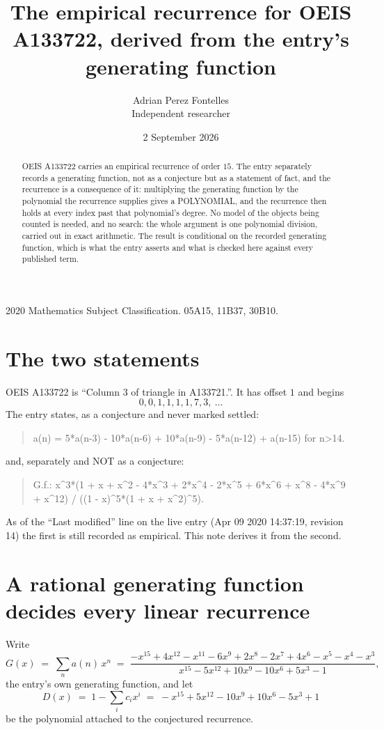 \documentclass[11pt,a4paper]{article}
\title{The empirical recurrence for OEIS A133722, derived from the entry's generating function}
\author{Adrian Perez Fontelles\\ \small Independent researcher}
\date{2 September 2026}
\theoremstyle{plain}
\theoremstyle{definition}
\begin{document}
\maketitle

\begin{abstract}
OEIS A133722 carries an empirical recurrence of order $15$. The entry separately records a
generating function, not as a conjecture but as a statement of fact, and the recurrence is a
consequence of it: multiplying the generating function by the polynomial the recurrence
supplies gives a POLYNOMIAL, and the recurrence then holds at every index past that
polynomial's degree. No model of the objects being counted is needed, and no search: the
whole argument is one polynomial division, carried out in exact arithmetic. The result is
conditional on the recorded generating function, which is what the entry asserts and what is
checked here against every published term.
\end{abstract}

\noindent\small 2020 Mathematics Subject Classification. 05A15, 11B37, 30B10.\normalsize

\section{The two statements}

OEIS A133722 is ``Column 3 of triangle in A133721.''. It has offset $1$ and begins
\[
0, 0, 1, 1, 1, 1, 7, 3,\ \dots
\]
The entry states, as a conjecture and never marked settled:
\begin{quote}
a(n) = 5*a(n-3) - 10*a(n-6) + 10*a(n-9) - 5*a(n-12) + a(n-15) for n>14.
\end{quote}
and, separately and NOT as a conjecture:
\begin{quote}
G.f.: x\^{}3*(1 + x + x\^{}2 - 4*x\^{}3 + 2*x\^{}4 - 2*x\^{}5 + 6*x\^{}6 + x\^{}8 - 4*x\^{}9 + x\^{}12) / ((1 - x)\^{}5*(1 + x + x\^{}2)\^{}5).
\end{quote}
As of the ``Last modified'' line on the live entry (Apr 09 2020 14:37:19, revision 14) the first is still
recorded as empirical. This note derives it from the second.

\section{A rational generating function decides every linear recurrence}

Write
\[
G(x)\;=\;\sum_{n}a(n)\,x^{n}\;=\;\frac{- x^{15} + 4 x^{12} - x^{11} - 6 x^{9} + 2 x^{8} - 2 x^{7} + 4 x^{6} - x^{5} - x^{4} - x^{3}}{x^{15} - 5 x^{12} + 10 x^{9} - 10 x^{6} + 5 x^{3} - 1},
\]
the entry's own generating function, and let
\[
D(x)\;=\;1-\sum_i c_i x^{i}\;=\;- x^{15} + 5 x^{12} - 10 x^{9} + 10 x^{6} - 5 x^{3} + 1
\]
be the polynomial attached to the conjectured recurrence.
\end{document}
